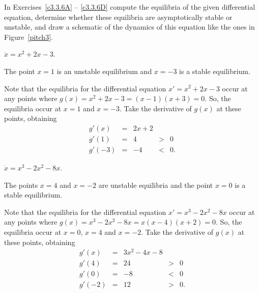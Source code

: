 \documentclass{ximera}
\begin{document}
\noindent In Exercises~\ref{c3.3.6A} -- \ref{c3.3.6D} compute the equilibria 
of the given differential equation, determine whether these equilibria are 
asymptotically stable or unstable, and draw a sche\-ma\-tic of the dynamics 
of this equation like the ones in Figure~\ref{pitch3}.  
\begin{computerExercise} \label{c3.3.6A}
$\dot{x} = x^2 + 2x - 3$.

\begin{solution}

\ans The point $x = 1$ is an unstable equilibrium and $x = -3$ is a stable
equilibrium.

\soln Note that the equilibria for the differential equation
$x' = x^2 + 2x - 3$ occur at any points where
$g(x) = x^2 + 2x - 3 = (x - 1)(x + 3) = 0$.
So, the equilibria occur at $x = 1$ and $x = -3$.  Take the
derivative of $g(x)$ at these points, obtaining
\[
\begin{array}{rcccl}
g'(x) & = & 2x + 2 \\
g'(1) & = & 4 & > & 0 \\
g'(-3) & = & -4 & < & 0.\end{array}
\]


\end{solution}
\end{computerExercise}
\begin{computerExercise} \label{c3.3.6B}
$\dot{x} = x^3 - 2x^2 - 8x$.

\begin{solution}

\ans The points $x=4$ and $x = -2$ are unstable equilibria and the point 
$x = 0$ is a stable equilibrium.

\soln Note that the equilibria for the differential equation
$x' = x^3 - 2x^2 - 8x$ occur at any points where
$g(x) = x^3 - 2x^2 - 8x = x(x - 4)(x + 2) = 0$.
So, the equilibria occur at $x=0$, $x = 4$ and $x = -2$.  Take the
derivative of $g(x)$ at these points, obtaining
\[
\begin{array}{rcccl}
g'(x) & = & 3x^2-4x-8 \\
g'(4) & = & 24 & > & 0 \\
g'(0) & = & -8 & < & 0\\
g'(-2) & = & 12 & > & 0.\end{array}
\]

\end{solution}
\end{computerExercise}
\end{document}
